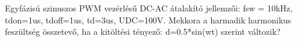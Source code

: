 \begin{example}

Egyfázisú szinuszos PWM vezérlésű DC-AC átalakító jellemzői:
fsw = 10kHz, tdon=1us, tdoff=1us, td=3us, UDC=100V.
Mekkora a harmadik harmonikus feszültség összetevő, ha a kitöltési tényező:
d=0.5*sin(wt) szerint változik?


\tcbline
\vspace{1mm}

\solution

\end{example}